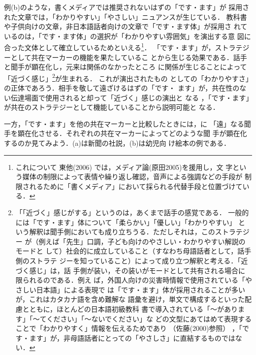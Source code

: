 \documentclass[japanese]{jnlp_1.3c}
\begin{document}
例(b)のような，書くメディアでは推奨されないはずの「です・ます」が
採用された文章では，「わかりやすい」「やさしい」ニュアンスが生じている．
教科書や子供向けの文章，非日本語話者向けの文章で「です・ます体」が採用さ
れているのは，「です・ます体」の選択が「わかりやすい雰囲気」を演出する意
図に合った文体として確立しているためといえる\footnote{
	これについて
	東他(2006)
	では，メディア論(原田2005)を援用し，文
	字という媒体の制限によって表情や繰り返し確認，音声による強調などの手段が
	制限されるために「書くメディア」において採られる代替手段と位置づけている．}．
「です・ます」が，ストラテジーとして共在マーカーの機能を果たしているこ
とから生じる効果である．話手と聞手が顕在化し，元来は関係のなかったところ
に関係が生じることによって「近づく感じ」\unskip\footnote{
	「「近づく」感じがする」というのは，あくまで話手の感覚である．
	一般的には「です・ます」体について「柔らかい」「優しい」「わかりやすい」
	という解釈は聞手側においても成り立ちうる．ただしそれは，このストラテジー
	が（例えば「先生」口調，子ども向けのやさしい・わかりやすい解説のモードと
	して）社会的に成立していること（すなわち母語話者として，話手側のストラテ
	ジーを知っていること）によって成り立つ解釈と考える．「近づく感じ」は，話
	手側が装い，その装いがモードとして共有される場合に限られるのである．例え
	ば，外国人向けの災害時情報で使用されている「やさしい日本語」による表現で
	は「です・ます」体が採用されることが多いが，これはカタカナ語を含め難解な
	語彙を避け，単文で構成するといった配慮とともに，ほとんどの日本語初級教科
	書で導入されている「〜があります」「〜てください」「〜ないでください」な
	どの文型にあてはめて表現することで「わかりやすく」情報を伝えるためであり
	（佐藤(2000)参照）
	，「です・ます」が，非母語話者にとっての「やさしさ」に直結するものではな
	い．}が生まれる．
これが演出されたもの
としての「わかりやすさ」の正体であろう．相手を敬して遠ざけるはずの「です・
ます」が，共在性のない伝達場面で使用されると却って「近づく」感じの演出と
なる
，「です・ます」が共在のストラテジーとして機能していることから説明可能と
なる．

\def\boutenchar{}
\def\bou#1{}
 \def\getlength#1{}
 \def\dot#1{}

一方，「です・ます」を他の共在マーカーと比較したときには，\bou{相対的}に
「遠」なる聞手を顕在化させる．それぞれの共在マーカーによってどのような聞
手が顕在化するのか見てみよう．(a)は新聞の社説，(b)は幼児向
け絵本の例である．

\end{document}
